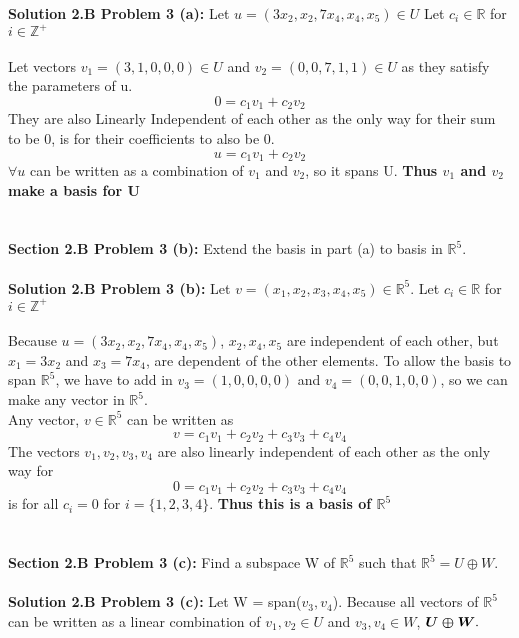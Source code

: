 \documentclass[12pt]{article}
\begin{document}
\noindent \textbf{Solution 2.B Problem 3 (a): } Let $u = (3x_2, x_2, 7x_4,x_4,x_5) \in U$ Let $c_i \in \mathbb{R}$ for $i \in \mathbb{Z}^+$
\\\\
Let vectors $v_1 = (3, 1, 0, 0, 0) \in U$ and $v_2 = (0, 0, 7, 1, 1) \in U$ as they satisfy the parameters of u. 
		$$0 = c_1 v_1 + c_2 v_2$$
They are also Linearly Independent of each other as the only way for their sum to be 0, is for their coefficients to also be 0. 
$$u = c_1v_1 + c_2v_2$$
$\forall u$ can be written as a combination of $v_1$ and $v_2$, so it spans U.  \textbf{\boldmath Thus $v_1$ and $v_2$ make a basis for U}
\\\\\\
\noindent \textbf{Section 2.B Problem 3 (b): } Extend the basis in part (a) to basis in $\mathbb{R}^5$. 
\\\\
\noindent \textbf{Solution 2.B Problem 3 (b): } Let $v = (x_1,x_2,x_3,x_4,x_5) \in \mathbb{R}^5$. Let $c_i \in \mathbb{R}$ for $i \in \mathbb{Z}^+$
\\\\
Because $u = (3x_2, x_2, 7x_4,x_4,x_5)$, $x_2, x_4,x_5$ are independent of each other, but $x_1 = 3x_2$ and $x_3 = 7x_4$, are dependent of the other elements. To allow the basis to span $\mathbb{R}^5$, we have to add in $v_3 = (1,0,0,0,0)$ and $v_4 = (0,0,1,0,0)$, so we can make any vector in $\mathbb{R}^5$. \\
Any vector, $v \in \mathbb{R}^5$ can be written as 
$$v = c_1v_1 + c_2v_2 + c_3v_3 + c_4v_4$$
The vectors $v_1,v_2,v_3,v_4$ are also linearly independent of each other as the only way for
$$0 = c_1v_1 + c_2v_2 + c_3v_3 + c_4v_4$$ 
is for all $c_i = 0$ for $i = \{1,2,3,4\}$.
\textbf{\boldmath Thus this is a basis of $\mathbb{R}^5$}
\\\\\\
\noindent \textbf{Section 2.B Problem 3 (c): } Find a subspace W of $\mathbb{R}^5$ such that $\mathbb{R}^5 = U \oplus W.$
\\\\
\noindent \textbf{Solution 2.B Problem 3 (c): } Let W = span($v_3,v_4$).  Because all vectors of $\mathbb{R}^5$ can be written as a linear combination of $v_1,v_2 \in U$ and $v_3,v_4 \in W$, $\text{\boldmath $U \oplus W$}.$

\newpage
\end{document}
